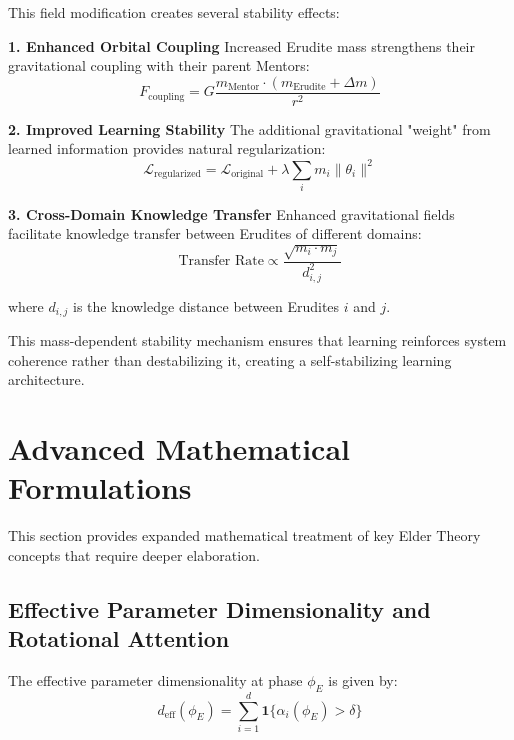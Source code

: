 This field modification creates several stability effects:

\textbf{1. Enhanced Orbital Coupling}
Increased Erudite mass strengthens their gravitational coupling with their parent Mentors:
\begin{equation}
F_{\text{coupling}} = G \frac{m_{\text{Mentor}} \cdot (m_{\text{Erudite}} + \Delta m)}{r^2}
\end{equation}

\textbf{2. Improved Learning Stability}
The additional gravitational "weight" from learned information provides natural regularization:
\begin{equation}
\mathcal{L}_{\text{regularized}} = \mathcal{L}_{\text{original}} + \lambda \sum_i m_i \|\theta_i\|^2
\end{equation}

\textbf{3. Cross-Domain Knowledge Transfer}
Enhanced gravitational fields facilitate knowledge transfer between Erudites of different domains:
\begin{equation}
\text{Transfer Rate} \propto \frac{\sqrt{m_i \cdot m_j}}{d_{i,j}^2}
\end{equation}

where $d_{i,j}$ is the knowledge distance between Erudites $i$ and $j$.

This mass-dependent stability mechanism ensures that learning reinforces system coherence rather than destabilizing it, creating a self-stabilizing learning architecture.

\section{Advanced Mathematical Formulations}

This section provides expanded mathematical treatment of key Elder Theory concepts that require deeper elaboration.

\subsection{Effective Parameter Dimensionality and Rotational Attention}

The effective parameter dimensionality at phase $\phi_E$ is given by:
\begin{equation}
d_{\text{eff}}(\phi_E) = \sum_{i=1}^{d} \mathbf{1}\{\alpha_i(\phi_E) > \delta\}
\end{equation}

